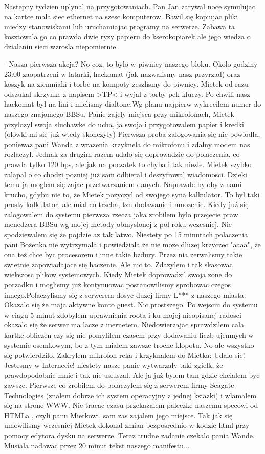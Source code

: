 \documentclass[a4paper,polish,titlepage,12pt]{article}
\begin{document}
Nastepny tydzien uplynal na przygotowaniach. Pan Jan zarywal noce symulujac na kartce mala siec ethernet na szesc komputerow. Bawil się kopiujac pliki miedzy stanowiskami lub uruchamiajac programy na serwerze. Zabawa ta kosztowala go co prawda dwie ryzy papieru do kserokopiarek ale jego wiedza o dzialaniu sieci wzrosla niepomiernie.

- Nasza pierwsza akcja? No coz, to bylo w piwnicy naszego bloku. Okolo godziny 23:00 zaopatrzeni w latarki, hackomat (jak nazwalismy nasz przyrzad) oraz koszyk na ziemniaki i torbe na kompoty zeszlismy do piwnicy. Mietek od razu odszukal skrzynke z napisem >TP< i wyjal z torby pek kluczy. Po chwili nasz hackomat byl na lini i mielismy dialtone.Wg planu najpierw wykrecilem numer do naszego znajomego BBSu. Panie zajely miejsca przy mikrofonach, Mietek przylozyl swoja sluchawke do ucha, ja swoja i przygotowalem papier i kredki (olowki mi się już wtedy skonczyly) Pierwsza proba zalogowania się nie powiodla, poniewaz pani Wanda z wrazenia krzyknela do mikrofonu i zdalny modem nas rozlaczyl. Jednak za drugim razem udalo się doprowadzic do polaczenia, co prawda tylko 120 bps, ale jak na poczatek to chyba i tak niezle. Mietek szybko zalapal o co chodzi pozniej już sam odbieral i deszyfrowal wiadomosci. Dzieki temu ja moglem się zajac przetwarzaniem danych. Naprawde byloby z nami krucho, gdybu nie to, że Mietek pozyczyl od swojego syna kalkulator. To byl taki prosty kalkulator, ale mial co trzeba, tzn dodawanie i mnozenie. Kiedy już się zalogowalem do systemu pierwsza rzecza jaka zrobilem bylo przejecie praw menedzera BBSu wg mojej metody obmyslonej z pol roku wczesniej. Nie spodziewalem się że pojdzie az tak latwo. Niestety po 15 minutach polaczenia pani Bożenka nie wytrzymala i powiedziala że nie moze dluzej krzyczec "aaaa", że ona też chce byc procesorem i inne takie bzdury. Przez nia zerwalismy takie swietnie zapowiadajace się haczenie. Ale nic to. Zdazylem i tak skasowac wiekszosc plikow systemowych. Kiedy Mietek doprowadzil swoja zone do porzadku i moglismy już kontynuowac postanowilismy sprobowac czegos innego.Polaczylismy się z serwerem dosyc duzej firmy L*** z naszego miasta. Okazalo się że maja aktywne konto guest. Nic prostszego. Po wejsciu do systemu w ciagu 5 minut zdobylem uprawnienia roota i ku mojej nieopisanej radosci okazalo się że serwer ma lacze z inernetem. Niedowierzajac sprawdzilem cala kartke obliczen czy się nie pomylilem czasem przy dodawaniu liczb ujemnych w systemie osemkowym, bo z tym mialem zawsze troche klopotu. No ale wszystko się potwierdzilo. Zakrylem mikrofon reka i krzyknalem do Mietka: Udalo sie! Jestesmy w Internecie! niestety nasze panie wytwarzaly taki zgielk, że prawdopodobnie mnie i tak nie usluszal. Ale ja już bylem tam gdzie chcialem byc zawsze. Pierwsze co zrobilem do polaczylem się z serwerem firmy Seagate Technologies (znalem dobrze ich system operacyjny z jednej ksiazki) i wlamalem się na strone WWW. Nie tracac czasu przekazalem paleczke naszemu specowi od HTMLa , czyli panu Mietkowi, sam zas zajalem jego miejsce. Tak jak się umowilismy wczesniej Mietek dokonal zmian bezposrednio w kodzie html przy pomocy edytora dysku na serwerze. Teraz trudne zadanie czekalo pania Wande. Musiala nadawac przez 20 minut tekst naszego manifestu...
\end{document}
